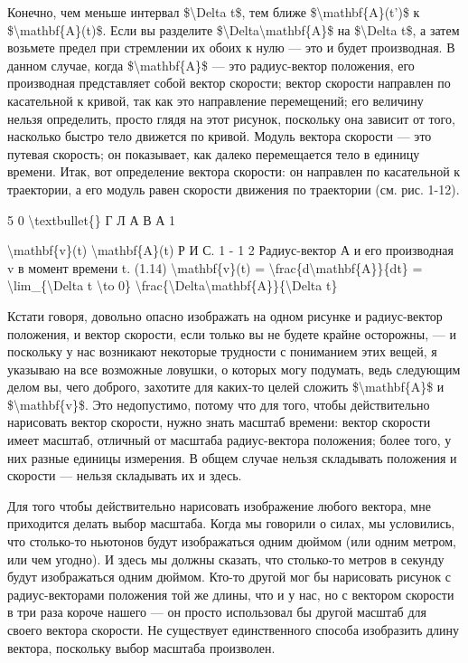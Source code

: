 \documentclass[10pt,oneside]{article}
\begin{document}
Конечно, чем меньше интервал \$\textbackslash{}Delta t\$, тем ближе \$\textbackslash{}mathbf\{A\}(t')\$ к \$\textbackslash{}mathbf\{A\}(t)\$. Если вы разделите \$\textbackslash{}Delta\textbackslash{}mathbf\{A\}\$ на \$\textbackslash{}Delta t\$, а затем возьмете предел при стремлении их обоих к нулю --- это и будет производная. В данном случае, когда \$\textbackslash{}mathbf\{A\}\$ --- это радиус-вектор положения, его производная представляет собой вектор скорости; вектор скорости направлен по касательной к кривой, так как это направление перемещений; его величину нельзя определить, просто глядя на этот рисунок, поскольку она зависит от того, насколько быстро тело движется по кривой. Модуль вектора скорости --- это путевая скорость; он показывает, как далеко перемещается тело в единицу времени. Итак, вот определение вектора скорости: он направлен по касательной к траектории, а его модуль равен скорости движения по траектории (см. рис. 1-12).\par

5 0 \textbackslash{}textbullet\{\} Г Л А В А   1\par

\textbackslash{}mathbf\{v\}(t) \textbackslash{}mathbf\{A\}(t) Р И С. 1 - 1 2 Радиус-вектор А и его производная v в момент времени t. (1.14) \textbackslash{}mathbf\{v\}(t) = \textbackslash{}frac\{d\textbackslash{}mathbf\{A\}\}\{dt\} = \textbackslash{}lim\_\{\textbackslash{}Delta t \textbackslash{}to 0\} \textbackslash{}frac\{\textbackslash{}Delta\textbackslash{}mathbf\{A\}\}\{\textbackslash{}Delta t\}\par

Кстати говоря, довольно опасно изображать на одном рисунке и радиус-вектор положения, и вектор скорости, если только вы не будете крайне осторожны, --- и поскольку у нас возникают некоторые трудности с пониманием этих вещей, я указываю на все возможные ловушки, о которых могу подумать, ведь следующим делом вы, чего доброго, захотите для каких-то целей сложить \$\textbackslash{}mathbf\{A\}\$ и \$\textbackslash{}mathbf\{v\}\$. Это недопустимо, потому что для того, чтобы действительно нарисовать вектор скорости, нужно знать масштаб времени: вектор скорости имеет масштаб, отличный от масштаба радиус-вектора положения; более того, у них разные единицы измерения. В общем случае нельзя складывать положения и скорости --- нельзя складывать их и здесь.\par

Для того чтобы действительно нарисовать изображение любого вектора, мне приходится делать выбор масштаба. Когда мы говорили о силах, мы условились, что столько-то ньютонов будут изображаться одним дюймом (или одним метром, или чем угодно). И здесь мы должны сказать, что столько-то метров в секунду будут изображаться одним дюймом. Кто-то другой мог бы нарисовать рисунок с радиус-векторами положения той же длины, что и у нас, но с вектором скорости в три раза короче нашего --- он просто использовал бы другой масштаб для своего вектора скорости. Не существует единственного способа изобразить длину вектора, поскольку выбор масштаба произволен.\par
\end{document}
